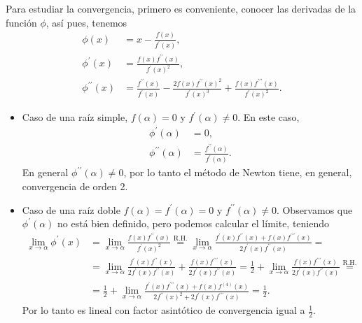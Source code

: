 Para estudiar la convergencia, primero es conveniente, conocer las derivadas de la función $\phi$, así pues,
tenemos
\[
    \begin{aligned}
        \phi(x) &= x - \frac{f(x)}{f^\prime(x)}, \\
        \phi^\prime(x) &= \frac{f(x)f^{\prime \prime}(x)}{f^\prime(x)^2}, \\
        \phi^{\prime \prime}(x) &= \frac{f^{\prime \prime}(x)}{f^\prime(x)} -
        \frac{2 f(x)f^{\prime \prime}(x)^2}{f^\prime(x)^3} +
        \frac{f(x)f^{\prime \prime \prime}(x)}{f^\prime(x)^2}.
    \end{aligned}
\]
\begin{itemize}
    \item Caso de una raíz simple, $f(\alpha) = 0$ y $f^\prime(\alpha) \neq 0$.
        En este caso,
        \[
            \begin{aligned}
                \phi^\prime(\alpha) &= 0, \\
                \phi^{\prime \prime}(\alpha) &= \frac{f^{\prime \prime}(\alpha)}{f^\prime(\alpha)}.
            \end{aligned}
        \]
        En general $\phi^{\prime \prime}(\alpha) \neq 0$, por lo tanto el método de Newton
        tiene, en general, convergencia de orden 2.
    \item Caso de una raíz doble $f(\alpha) = f^\prime(\alpha) = 0$ y $f^{\prime \prime}(\alpha) \neq 0$.
        Observamos que $\phi^\prime(\alpha)$ no está bien definido, pero podemos calcular el límite, teniendo
        \[
            \begin{aligned}
                \lim_{x \to \alpha} \phi^\prime(x) &= \lim_{x \to \alpha} \frac{f(x)f^{\prime \prime}(x)}{f^\prime(x)^2}
                \stackrel{\text{R.H.}}{=} \lim_{x \to \alpha}
                \frac{f^\prime(x)f^{\prime \prime}(x) + f(x)f^{\prime \prime \prime}(x)}
                {2 f^\prime(x)f^{\prime \prime}(x)} = \\ &= \lim_{x \to \alpha} 
                \frac{f^\prime(x)f^{\prime \prime}(x)}{2 f^\prime(x) f^{\prime \prime}(x)} +
                \frac{f(x)f^{\prime \prime \prime}(x)}{2 f^\prime(x)f^{\prime \prime}(x)} =
                \frac{1}{2} + \lim_{x \to \alpha} \frac{f(x)f^{\prime \prime \prime}(x)}
                {2f^\prime(x)f^{\prime \prime}(x)} \stackrel{\text{R.H.}}{=} \\ &= \frac{1}{2} +
                \lim_{x \to \alpha} \frac{f^\prime(x)f^{\prime \prime \prime}(x) + f(x)f^{(4)}(x)}
                {2f^{\prime \prime}(x)^2 + 2f^\prime(x)f^{\prime \prime \prime}(x)} = \frac{1}{2}.
            \end{aligned}
        \]
        Por lo tanto es lineal con factor asintótico de convergencia igual a $\frac{1}{2}$.


\end{itemize}

